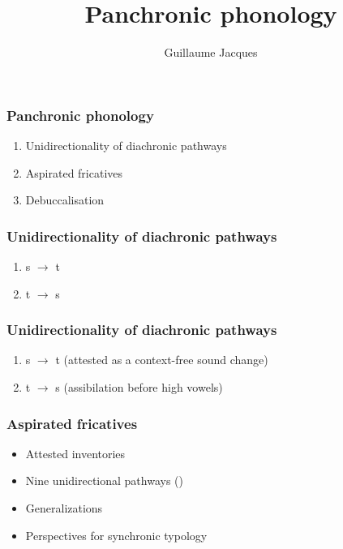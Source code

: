 \documentclass[xcolor=table]{beamer}
\begin{document}
 \title{Panchronic phonology}
 \author{Guillaume Jacques}
 \maketitle
 
  \begin{frame} 
 \frametitle{Panchronic phonology} 
 
 
 \begin{enumerate}[<+->]
 \item Unidirectionality of diachronic pathways
 \item Aspirated fricatives
 \item Debuccalisation
 \end{enumerate}
  
  \end{frame}   


  \begin{frame} 
 \frametitle{Unidirectionality of diachronic pathways} 
 

 
 \begin{enumerate}[<+->]
 \item s $\rightarrow$ t
 \item t $\rightarrow$ s
 \end{enumerate}
  
  \end{frame}   



  \begin{frame} 
 \frametitle{Unidirectionality of diachronic pathways} 
 
 \begin{enumerate}
 \item s $\rightarrow$ t (attested as a context-free sound change)
 \item t $\rightarrow$ s (assibilation before high vowels)
 \end{enumerate}
  
  \end{frame}   

  \begin{frame} 
 \frametitle{Aspirated fricatives} 
 
 \begin{itemize}
 \item Attested inventories
 \item  Nine unidirectional pathways (\citealt{jacques11lingua})
 \item Generalizations
 \item Perspectives for synchronic typology
 \end{itemize}

  \end{frame}   
\end{document}
